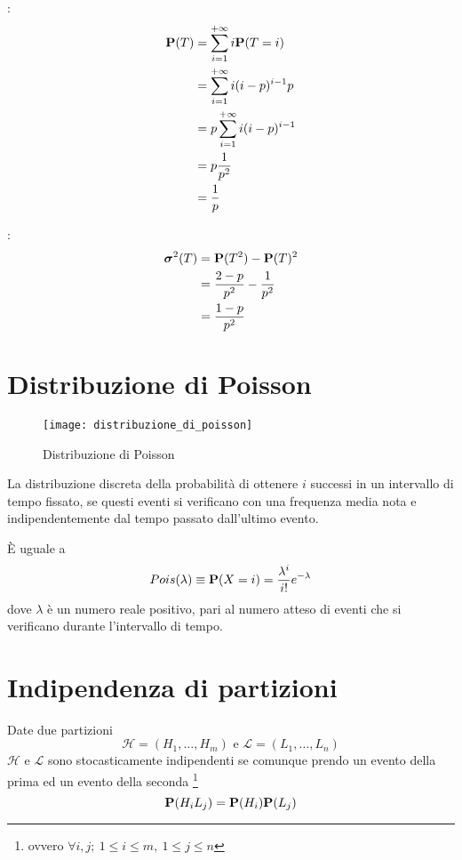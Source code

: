 :
\begin{align*}
  \mathbf{P}(T) &= \sum_{i=1}^{+ \infty} i \mathbf{P}(T = i) \\
  &= \sum_{i=1}^{+ \infty} i (i - p)^{i-1} p \\
  &= p \sum_{i=1}^{+ \infty} i (i - p)^{i-1} \\
  &= p \frac{1}{p^2} \\
  &= \frac{1}{p}
\end{align*}

:
\begin{align*}
  \boldsymbol\sigma^2(T) &= \mathbf{P}(T^2) - \mathbf{P}(T)^2 \\
  &= \frac{2-p}{p^2} - \frac{1}{p^2} \\
  &= \frac{1-p}{p^2}
\end{align*}


\section{Distribuzione di Poisson} %
\begin{figure*}
  \texttt{[image: distribuzione\_di\_poisson]}
  \caption{Distribuzione di Poisson} 
\end{figure*}

\begin{definition}
  \label{def:distribuzione_di_poisson}
  La distribuzione discreta della probabilità di ottenere \( i \) successi in un intervallo di tempo fissato,
  se questi eventi si verificano con una frequenza media nota e indipendentemente dal tempo passato dall'ultimo evento.

  È uguale a
  \[
    Pois(\lambda) \equiv \mathbf{P}(X = i) = \frac{\lambda^i}{i!} e^{- \lambda}
  \]
  dove \( \lambda \) è un numero reale positivo, pari al numero atteso di eventi che si verificano durante l'intervallo di tempo.
\end{definition}

\section{Indipendenza di partizioni} %
\begin{definition}
  \label{def:indipendenza_di_partizioni}
  Date due partizioni
  \[
    \mathcal{H} = (H_1, \ldots, H_m) \text{ e } \mathcal{L} = (L_1, \ldots, L_n)
  \]
  \( \mathcal{H} \) e \( \mathcal{L} \) sono stocasticamente indipendenti se comunque prendo un evento della prima ed un evento della seconda
  \footnote{ovvero \( \forall i, j; ~ 1 \le i \le m, ~ 1 \le j \le n \)}
  \[
    \mathbf{P}(H_i L_j) = \mathbf{P}(H_i) \mathbf{P}(L_j)
  \]
\end{definition}

